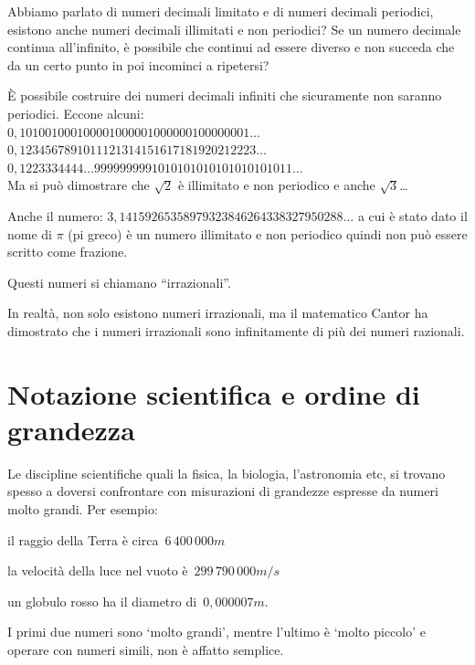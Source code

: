 \begin{osservazione}
 Abbiamo parlato di numeri decimali limitato e di numeri decimali 
periodici, esistono anche numeri decimali illimitati e non periodici?
Se un numero decimale continua all'infinito, è possibile che continui ad 
essere diverso e non succeda che da un certo punto in poi incominci a 
ripetersi?

È possibile costruire dei numeri decimali infiniti che sicuramente non 
saranno periodici. Eccone alcuni:\\
\(0,101001000100001000001000000100000001\dots\)\\
\(0,1234567891011121314151617181920212223\dots\)\\
\(0,1223334444\dots9999999991010101010101010101011\dots\)\\
Ma si può dimostrare che \(\sqrt{2}\) è illimitato e non periodico
e anche \(\sqrt{3}\)\dots 

Anche il numero: \(3,14159265358979323846264338327950288\dots\) a cui è 
stato dato il nome di \(\pi\) (pi greco) è un numero 
illimitato e non periodico quindi non può essere scritto come frazione.

Questi numeri si chiamano ``irrazionali''.

In realtà, non solo esistono numeri irrazionali, ma il matematico Cantor ha 
dimostrato che i numeri irrazionali sono infinitamente di più dei numeri 
razionali.
\end{osservazione}

\section{Notazione scientifica e ordine di grandezza}
\label{sec:razionali_notazione_scientifica}

Le discipline scientifiche quali la fisica, la biologia, l'astronomia etc,
si trovano spesso a doversi confrontare con misurazioni di grandezze 
espresse 
da numeri molto grandi. Per esempio:

\begin{itemize*}
\item il raggio della Terra è circa~$6\,400\,000\unit{m}$
\item la velocità della luce nel vuoto è~$299\,790\,000\unit{m/s}$
\item un globulo rosso ha il diametro di~$0,000007\unit{m}$.
\end{itemize*}

I primi due numeri sono `molto grandi', mentre l'ultimo è `molto piccolo' e 
operare con numeri simili, non è affatto semplice.

